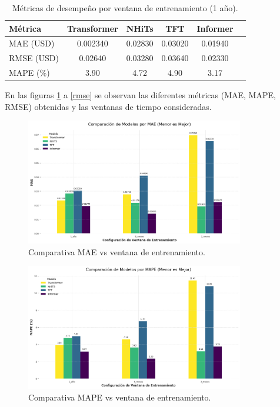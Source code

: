 \documentclass[12pt]{article}
\begin{document}
\begin{table}[H]
\centering
\caption{Métricas de desempeño por ventana de entrenamiento (1 año).}
\begin{tabular}{lccccc}
\toprule
\textbf{Métrica} & \textbf{Transformer} & \textbf{NHiTs} & \textbf{TFT} & \textbf{Informer} \\ 
\midrule
MAE (USD)  & 0.002340 & 0.02830 & 0.03020 & 0.01940 \\
RMSE (USD) & 0.02640 & 0.03280 & 0.03640 & 0.02330 \\
MAPE (\%)  & 3.90 & 4.72 & 4.90 & 3.17 \\
\bottomrule
\end{tabular}
\label{metricas_1_anio}
\end{table}


En las figuras \ref{mae} a \ref{rmse} se observan las diferentes métricas (MAE, MAPE, RMSE) obtenidas y las ventanas de tiempo consideradas.

\begin{figure}[H] 
\centering
\includegraphics[width=0.85\textwidth]{./results/comparacion_modelos_por_MAE.png} 
\caption{Comparativa MAE vs ventana de entrenamiento.}
\label{mae}
\end{figure}

\begin{figure}[H] 
\centering
\includegraphics[width=0.85\textwidth]{./results/comparacion_modelos_por_MAPE.png} 
\caption{Comparativa MAPE vs ventana de entrenamiento.}
\label{mape}
\end{figure}
\end{document}
